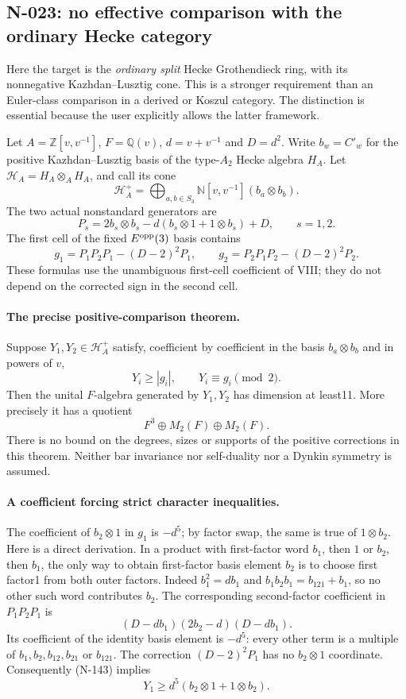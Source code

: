\subsection{N-023: no effective comparison with the ordinary Hecke category}

Here the target is the \emph{ordinary split} Hecke Grothendieck ring,
with its nonnegative Kazhdan--Lusztig cone.  This is a stronger
requirement than an Euler-class comparison in a derived or Koszul
category.  The distinction is essential because the user explicitly
allows the latter framework.

Let $A=\mathbb Z[v,v^{-1}]$, $F=\mathbb Q(v)$,
$d=v+v^{-1}$ and $D=d^2$.  Write $b_w=C'_w$ for the positive
Kazhdan--Lusztig basis of the type-$A_2$ Hecke algebra $H_A$.
Let $\mathscr H_A=H_A\otimes_A H_A$, and call its cone
\[
 \mathscr H_A^+=\bigoplus_{a,b\in S_3}
       \mathbb N[v,v^{-1}](b_a\otimes b_b).
 \tag{N-140}
\]
The two actual nonstandard generators are
\[
 P_s=2b_s\otimes b_s-d(b_s\otimes1+1\otimes b_s)+D,
 \qquad s=1,2.
 \tag{N-141}
\]
The first cell of the fixed $E^{\rm opp}(3)$ basis contains
\[
 g_1=P_1P_2P_1-(D-2)^2P_1,\qquad
 g_2=P_2P_1P_2-(D-2)^2P_2.
 \tag{N-142}
\]
These formulas use the unambiguous first-cell coefficient of VIII;
they do not depend on the corrected sign in the second cell.

\paragraph{The precise positive-comparison theorem.}
Suppose $Y_1,Y_2\in\mathscr H_A^+$ satisfy, coefficient by coefficient
in the basis $b_a\otimes b_b$ and in powers of $v$,
\[
                  Y_i\ge |g_i|,\qquad Y_i\equiv g_i\pmod2.
                  \tag{N-143}
\]
Then the unital $F$-algebra generated by $Y_1,Y_2$ has dimension at
least11.  More precisely it has a quotient
\[
                   F^3\oplus M_2(F)\oplus M_2(F).
                   \tag{N-144}
\]
There is no bound on the degrees, sizes or supports of the positive
corrections in this theorem.  Neither bar invariance nor self-duality
nor a Dynkin symmetry is assumed.

\paragraph{A coefficient forcing strict character inequalities.}
The coefficient of $b_2\otimes1$ in $g_1$ is $-d^5$; by factor swap,
the same is true of $1\otimes b_2$.  Here is a direct derivation.
In a product with first-factor word $b_1$, then $1$ or $b_2$, then
$b_1$, the only way to obtain first-factor basis element $b_2$ is
to choose first factor1 from both outer factors.  Indeed
$b_1^2=db_1$ and $b_1b_2b_1=b_{121}+b_1$, so no other such word
contributes $b_2$.  The corresponding second-factor coefficient in
$P_1P_2P_1$ is
\[
       (D-db_1)(2b_2-d)(D-db_1).
\]
Its coefficient of the identity basis element is $-d^5$:
every other term is a multiple of $b_1,b_2,b_{12},b_{21}$ or
$b_{121}$.  The correction $(D-2)^2P_1$ has no $b_2\otimes1$
coordinate.  Consequently (N-143) implies
\[
         Y_1\ge d^5(b_2\otimes1+1\otimes b_2).
         \tag{N-145}
\]

